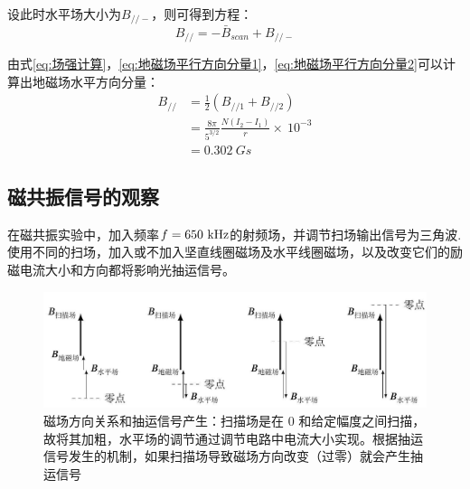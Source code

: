 \documentclass[10pt,hyperref,a4paper,UTF8]{ctexart}
\newcommand{\pll}{/\!/}
\begin{document}
                设此时水平场大小为$B_{\pll -}$，则可得到方程：
                        \begin{equation}\label{eq:地磁场平行方向分量2}
                                B_{\pll}=-\bar{B}_{scan}+B_{\pll -}
                        \end{equation}

                由式\ref{eq:场强计算}，\ref{eq:地磁场平行方向分量1}，\ref{eq:地磁场平行方向分量2}可以计算出地磁场水平方向分量：
                        \begin{equation*}
                        \begin{split}
                        B_{\pll}&=\frac{1}{2}\left(B_{\pll 1}+B_{\pll 2}\right) \\
                        &=\frac{8\pi}{5^{3/2}}\frac{N(I_{2} - I_{1})}{r}\times\ 10^{-3} \\
                        &=0.302\ \unit{Gs}
                        \end{split}
                        \end{equation*}

        \subsection{磁共振信号的观察}
                在磁共振实验中，加入频率$f=650\ \rm kHz$的射频场，并调节扫场输出信号为三角波. 
                使用不同的扫场，加入或不加入坚直线圈磁场及水平线圈磁场，以及改变它们的励磁电流大小和方向都将影响光抽运信号。
                        \begin{figure}[htbp]\label{fig:磁共振信号磁场}
                                \centering
                                \includegraphics[width=\textwidth]{figures/2024_11_21_2f14a66c261050f0bd54g-08.jpg}
                                \caption{磁场方向关系和抽运信号产生：扫描场是在 0 和给定幅度之间扫描，故将其加粗，水平场的调节通过调节电路中电流大小实现。根据抽运信号发生的机制，如果扫描场导致磁场方向改变（过零）就会产生抽运信号}
                        \end{figure}
\end{document}
